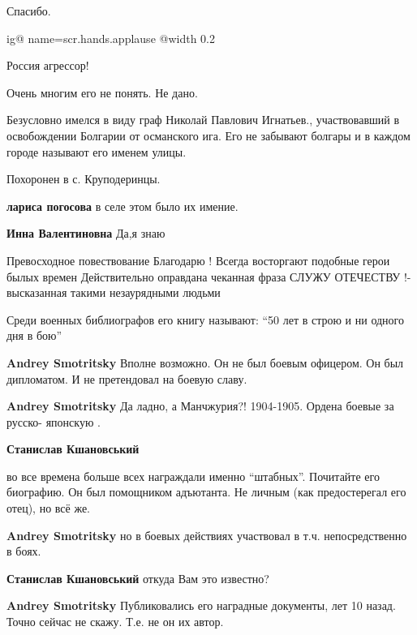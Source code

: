 \begin{itemize}
Спасибо.


\ifcmt
  ig@ name=scr.hands.applause
  @width 0.2
\fi

Россия агрессор!

Очень многим его не понять. Не дано.


Безусловно имелся в виду граф Николай Павлович
Игнатьев., участвовавший в освобождении Болгарии от османского ига. Его не
забывают болгары и в каждом городе называют его именем улицы.

Похоронен в с. Круподеринцы.

\begin{itemize} %
\textbf{лариса погосова} в селе этом было их имение.

\textbf{Инна Валентиновна}
Да,я знаю
\end{itemize} %

Превосходное повествование Благодарю !
Всегда восторгают подобные герои былых времен
Действительно оправдана чеканная фраза СЛУЖУ ОТЕЧЕСТВУ !- высказанная такими незаурядными людьми

Среди военных библиографов его книгу называют: \enquote{50 лет в строю и ни одного дня в бою}

\begin{itemize} %
\textbf{Andrey Smotritsky} Вполне возможно. Он не был боевым офицером. Он был дипломатом. И не претендовал на боевую славу.

\textbf{Andrey Smotritsky} Да ладно, а Манчжурия?! 1904-1905. Ордена боевые за русско- японскую .

\begin{itemize} %
\textbf{Станислав Кшановський} 

во все времена больше всех награждали именно \enquote{штабных}. Почитайте его
биографию. Он был помощником адъютанта. Не личным (как предостерегал его отец),
но всё же.


\textbf{Andrey Smotritsky} но в боевых действиях участвовал в т.ч. непосредственно в боях.

\textbf{Станислав Кшановський} откуда Вам это известно?

\textbf{Andrey Smotritsky} Публиковались его наградные документы, лет 10 назад. Точно сейчас не скажу. Т.е. не он их автор.
\end{itemize} %


\end{itemize}
\end{itemize}
